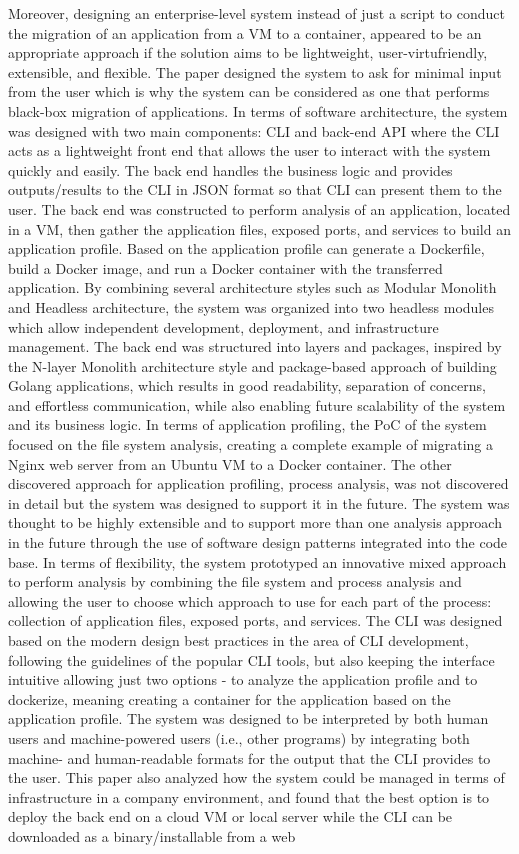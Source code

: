 \documentclass[twocolumn]{article}
\begin{document}
Moreover, designing an enterprise-level system instead of just a script to conduct the migration of an application from a VM to a container, appeared to be an appropriate approach if the solution aims to be lightweight, user-virtufriendly, extensible, and flexible. The paper designed the system to ask for minimal input from the user which is why the system can be considered as one that performs black-box migration of applications. In terms of software architecture, the system was designed with two main components: CLI and back-end API where the CLI acts as a lightweight front end that allows the user to interact with the system quickly and easily. The back end handles the business logic and provides outputs/results to the CLI in JSON format so that CLI can present them to the user. The back end was constructed to perform analysis of an application, located in a VM, then gather the application files, exposed ports, and services to build an application profile. Based on the application profile can generate a Dockerfile, build a Docker image, and run a Docker container with the transferred application. By combining several architecture styles such as Modular Monolith and Headless architecture, the system was organized into two headless modules which allow independent development, deployment, and infrastructure management. The back end was structured into layers and packages, inspired by the N-layer Monolith architecture style and package-based approach of building Golang applications, which results in good readability, separation of concerns, and effortless communication, while also enabling future scalability of the system and its business logic. In terms of application profiling, the PoC of the system focused on the file system analysis, creating a complete example of migrating a Nginx web server from an Ubuntu VM to a Docker container. The other discovered approach for application profiling, process analysis, was not discovered in detail but the system was designed to support it in the future. The system was thought to be highly extensible and to support more than one analysis approach in the future through the use of software design patterns integrated into the code base. In terms of flexibility, the system prototyped an innovative mixed approach to perform analysis by combining the file system and process analysis and allowing the user to choose which approach to use for each part of the process: collection of application files, exposed ports, and services. The CLI was designed based on the modern design best practices in the area of CLI development, following the guidelines of the popular CLI tools, but also keeping the interface intuitive allowing just two options - to analyze the application profile and to dockerize, meaning creating a container for the application based on the application profile. The system was designed to be interpreted by both human users and machine-powered users (i.e., other programs) by integrating both machine- and human-readable formats for the output that the CLI provides to the user. This paper also analyzed how the system could be managed in terms of infrastructure in a company environment, and found that the best option is to deploy the back end on a cloud VM or local server while the CLI can be downloaded as a binary/installable from a web 
\end{document}
